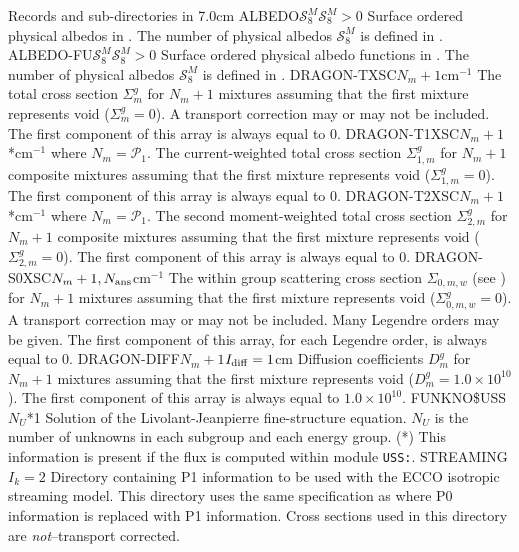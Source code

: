 \begin{DescriptionEnregistrement}{Records and sub-directories in }{7.0cm}
\OptRealEnr
  {ALBEDO}{$\mathcal{S}^{M}_{8}$}{$\mathcal{S}^{M}_{8}>0$}{}
  {Surface ordered physical albedos in . The number of physical albedos $\mathcal{S}^{M}_{8}$ is defined
  in .}
\OptRealEnr
  {ALBEDO-FU}{$\mathcal{S}^{M}_{8}$}{$\mathcal{S}^{M}_{8}>0$}{}
  {Surface ordered physical albedo functions in . The number of physical albedos $\mathcal{S}^{M}_{8}$ is defined
  in .}
\RealEnr
  {DRAGON-TXSC}{$N_{m}+1$}{cm$^{-1}$}
  {The total cross section $\Sigma_{m}^{g}$ for $N_{m}+1$ mixtures assuming that the first mixture
   represents void ($\Sigma_{m}^{g}=0$). A transport correction may or may not
   be included. The first component of this array is always equal to 0.}
\OptRealEnr
  {DRAGON-T1XSC}{$N_{m}+1$}{*}{cm$^{-1}$}
  {where $N_{m}=\mathcal{P}_{1}$. The current-weighted total cross section $\Sigma_{1,m}^{g}$ for $N_{m}+1$ composite mixtures assuming that the first mixture
   represents void ($\Sigma_{1,m}^{g}=0$). The first component of this array is always equal to 0.}
\OptRealEnr
  {DRAGON-T2XSC}{$N_{m}+1$}{*}{cm$^{-1}$}
  {where $N_{m}=\mathcal{P}_{1}$. The second moment-weighted total cross section $\Sigma_{2,m}^{g}$ for $N_{m}+1$ composite mixtures assuming that the first mixture
   represents void ($\Sigma_{2,m}^{g}=0$). The first component of this array is always equal to 0.}
\RealEnr
  {DRAGON-S0XSC}{$N_{m}+1,N_{\rm ans}$}{cm$^{-1}$}
  {The within group scattering cross section $\Sigma_{0,m,w}$ (see )
   for $N_{m}+1$ mixtures assuming that the first mixture
   represents void ($\Sigma_{0,m,w}^{g}=0$). A transport correction may or may not
   be included. Many Legendre orders may be given. The first component of this
   array, for each Legendre order, is always equal to 0.}
\OptRealEnr
  {DRAGON-DIFF}{$N_{m}+1$}{$I_{\rm diff}=1$}{cm}
  {Diffusion coefficients $D_{m}^{g}$ for $N_{m}+1$ mixtures assuming that the first mixture
   represents void ($D_{m}^{g}=1.0\times 10^{10}$). The first component of this array is always equal to $1.0\times 10^{10}$.}
\OptRealEnr
  {FUNKNO\$USS}{$N_{U}$}{*}{1}
  {Solution of the Livolant-Jeanpierre fine-structure equation. $N_{U}$ is the number of unknowns in each subgroup and each energy group. (*) This information is
  present if the flux is computed within module {\tt USS:}.}
\OptDirEnr
  {STREAMING}{$I_{k}=2$}
  {Directory containing P1 information to be used with the ECCO isotropic
  streaming model. This directory uses the same specification as 
  where P0 information is replaced with P1 information. Cross sections
  used in this directory are {\sl not}--transport corrected.} 
\end{DescriptionEnregistrement}

